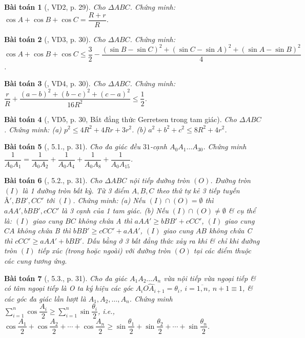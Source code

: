 \documentclass{article}
\newtheorem{baitoan}{Bài toán}
\begin{document}
\begin{baitoan}[\cite{Hung_nang_cao_phat_trien_Toan_11_tap_1}, VD2, p. 29]
	Cho $\Delta ABC$. Chứng minh: $\cos A + \cos B + \cos C = \dfrac{R + r}{R}$.
\end{baitoan}

\begin{baitoan}[\cite{Hung_nang_cao_phat_trien_Toan_11_tap_1}, VD3, p. 30]
	Cho $\Delta ABC$. Chứng minh: $\cos A + \cos B + \cos C\le\dfrac{3}{2} - \dfrac{(\sin B - \sin C)^2 + (\sin C - \sin A)^2 + (\sin A - \sin B)^2}{4}$.
\end{baitoan}

\begin{baitoan}[\cite{Hung_nang_cao_phat_trien_Toan_11_tap_1}, VD4, p. 30]
	Cho $\Delta ABC$. Chứng minh: $\dfrac{r}{R} + \dfrac{(a - b)^2 + (b - c)^2 + (c - a)^2}{16R^2}\le\dfrac{1}{2}$.
\end{baitoan}

\begin{baitoan}[\cite{Hung_nang_cao_phat_trien_Toan_11_tap_1}, VD5, p. 30, Bất đẳng thức Gerretsen trong tam giác]
	Cho $\Delta ABC$. Chứng minh: (a) $p^2\le4R^2 + 4Rr + 3r^2$. (b) $a^2 + b^2 + c^2\le8R^2 + 4r^2$.
\end{baitoan}

\begin{baitoan}[\cite{Hung_nang_cao_phat_trien_Toan_11_tap_1}, 5.1., p. 31]
	Cho đa giác đều $31$-cạnh $A_0A_1\ldots A_{30}$. Chứng minh $\dfrac{1}{A_0A_1} = \dfrac{1}{A_0A_2} + \dfrac{1}{A_0A_4} + \dfrac{1}{A_0A_8} + \dfrac{1}{A_0A_{15}}$.
\end{baitoan}

\begin{baitoan}[\cite{Hung_nang_cao_phat_trien_Toan_11_tap_1}, 5.2., p. 31]
	Cho $\Delta ABC$ nội tiếp đường tròn $(O)$. Đường tròn $(I)$ là 1 đường tròn bất kỳ. Từ 3 điểm $A,B,C$ theo thứ tự kẻ 3 tiếp tuyến $Â',BB',CC'$ tới $(I)$. Chứng minh: (a) Nếu $(I)\cap(O) = \emptyset$ thì $aAA',bBB',cCC'$ là 3 cạnh của 1 tam giác. (b) Nếu $(I)\cap(O)\ne\emptyset$ \& cụ thể là: $(I)$ giao cung $BC$ không chứa A thì $aAA'\ge bBB' + cCC'$, $(I)$ giao cung $CA$ không chứa B thì $bBB'\ge cCC' + aAA'$, $(I)$ giao cung $AB$ không chứa C thì $cCC'\ge aAA' + bBB'$. Dấu bằng ở 3 bất đẳng thức xảy ra khi \& chỉ khi đường tròn $(I)$ tiếp xúc (trong hoặc ngoài) với đường tròn $(O)$ tại các điểm thuộc các cung tương ứng.
\end{baitoan}

\begin{baitoan}[\cite{Hung_nang_cao_phat_trien_Toan_11_tap_1}, 5.3., p. 31]
	Cho đa giác $A_1A_2\ldots A_n$ vừa nội tiếp vừa ngoại tiếp \& có tâm ngoại tiếp là O ta ký hiệu các góc $\widehat{A_iOA_{i+1}} = \theta_i$, $i = \overline{1,n}$, $n + 1\equiv1$, \& các góc đa giác lần lượt là $A_1,A_2,\ldots,A_n$. Chứng minh $\sum_{i=1}^n \cos\dfrac{A_i}{2}\ge\sum_{i=1}^n \sin\dfrac{\theta_i}{2}$, i.e., $\cos\dfrac{A_1}{2} + \cos\dfrac{A_2}{2} + \cdots + \cos\dfrac{A_n}{2}\ge\sin\dfrac{\theta_1}{2} + \sin\dfrac{\theta_2}{2} + \cdots + \sin\dfrac{\theta_n}{2}$.
\end{baitoan}
\end{document}
